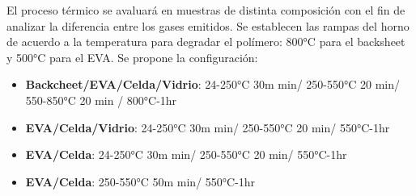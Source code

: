 El proceso térmico se avaluará en muestras de distinta composición con el fin de analizar la diferencia entre los gases emitidos. Se establecen las rampas del horno de acuerdo a la temperatura para degradar el polímero: 800°C para el backsheet y 500°C para el EVA. Se propone la configuración: 

\begin{itemize}
	\item \textbf{Backcheet/EVA/Celda/Vidrio}: 24-250°C 30m min/ 250-550°C 20 min/ 550-850°C 20 min / 800°C-1hr 
	\item \textbf{EVA/Celda/Vidrio}: 24-250°C 30m min/ 250-550°C 20 min/ 550°C-1hr 
	\item \textbf{EVA/Celda}: 24-250°C 30m min/ 250-550°C 20 min/ 550°C-1hr
	\item \textbf{EVA/Celda}: 250-550°C 50m min/ 550°C-1hr
	
\end{itemize}